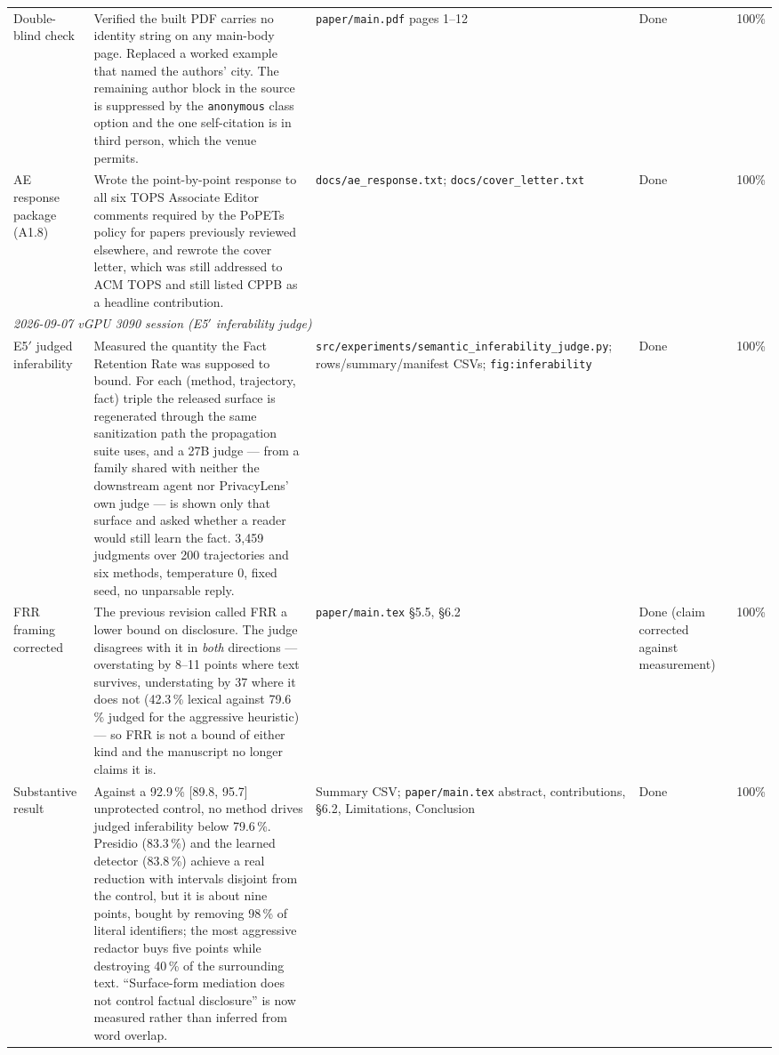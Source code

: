 \documentclass[11pt]{article}
\begin{document}
\begin{longtable}{p{}p{}p{}p{}p{}}
Double-blind check & Verified the built PDF carries no identity string on any main-body page. Replaced a worked example that named the authors' city. The remaining author block in the source is suppressed by the \texttt{anonymous} class option and the one self-citation is in third person, which the venue permits. & \texttt{paper/main.pdf} pages 1--12 & Done & 100\% \\
AE response package (A1.8) & Wrote the point-by-point response to all six TOPS Associate Editor comments required by the PoPETs policy for papers previously reviewed elsewhere, and rewrote the cover letter, which was still addressed to ACM TOPS and still listed CPPB as a headline contribution. & \texttt{docs/ae\_response.txt}; \texttt{docs/cover\_letter.txt} & Done & 100\%  \\
\midrule
\multicolumn{5}{l}{\emph{2026-09-07 vGPU 3090 session (E5$'$ inferability judge)}} \\
\midrule
E5$'$ judged inferability & Measured the quantity the Fact Retention Rate was supposed to bound. For each (method, trajectory, fact) triple the released surface is regenerated through the same sanitization path the propagation suite uses, and a 27B judge --- from a family shared with neither the downstream agent nor PrivacyLens' own judge --- is shown only that surface and asked whether a reader would still learn the fact. 3{,}459 judgments over 200 trajectories and six methods, temperature 0, fixed seed, no unparsable reply. & \texttt{src/experiments/semantic\_inferability\_judge.py}; rows/summary/manifest CSVs; \texttt{fig:inferability} & Done & 100\% \\
FRR framing corrected & The previous revision called FRR a lower bound on disclosure. The judge disagrees with it in \emph{both} directions --- overstating by 8--11 points where text survives, understating by 37 where it does not (42.3\,\% lexical against 79.6\,\% judged for the aggressive heuristic) --- so FRR is not a bound of either kind and the manuscript no longer claims it is. & \texttt{paper/main.tex} \S5.5, \S6.2 & Done (claim corrected against measurement) & 100\% \\
Substantive result & Against a 92.9\,\% [89.8, 95.7] unprotected control, no method drives judged inferability below 79.6\,\%. Presidio (83.3\,\%) and the learned detector (83.8\,\%) achieve a real reduction with intervals disjoint from the control, but it is about nine points, bought by removing 98\,\% of literal identifiers; the most aggressive redactor buys five points while destroying 40\,\% of the surrounding text. ``Surface-form mediation does not control factual disclosure'' is now measured rather than inferred from word overlap. & Summary CSV; \texttt{paper/main.tex} abstract, contributions, \S6.2, Limitations, Conclusion & Done & 100\% \\

\end{longtable}
\end{document}

